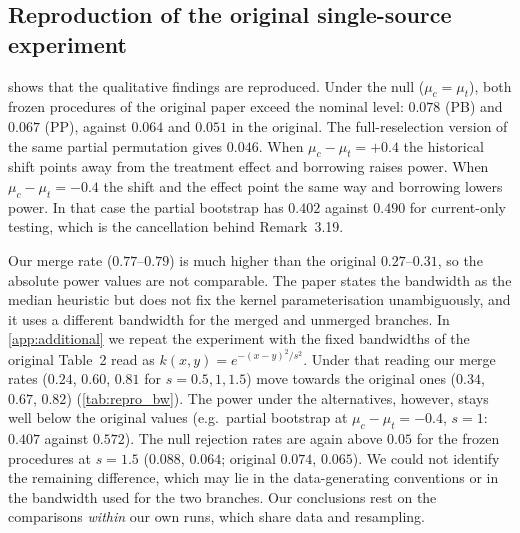 \subsection{Reproduction of the original single-source experiment}\label{sec:repro}

\begin{table}[h]
\centering\footnotesize\setlength{\tabcolsep}{4pt}
\caption{Reproduction of \citet[Table 2, median-heuristic row]{yang2026}: merge rate and rejection rates, $1000$ data sets per row ($m=50$, $n=\ell=100$, $\theta=0.4$, $\mu_h-\mu_c=0.2$). PB = partial bootstrap, PP = partial permutation; ``frozen'' is the original architecture, ``reselect'' repeats fusion in every permutation. Bold with $\uparrow$: Wilson 95\% interval above $0.05$.}\label{tab:repro}

\end{table}

 shows that the qualitative findings are reproduced. Under the null ($\mu_c=\mu_t$), both frozen procedures of the original paper exceed the nominal level: $0.078$ (PB) and $0.067$ (PP), against $0.064$ and $0.051$ in the original. The full-reselection version of the same partial permutation gives $0.046$. When $\mu_c-\mu_t=+0.4$ the historical shift points away from the treatment effect and borrowing raises power. When $\mu_c-\mu_t=-0.4$ the shift and the effect point the same way and borrowing lowers power. In that case the partial bootstrap has $0.402$ against $0.490$ for current-only testing, which is the cancellation behind Remark~3.19.

Our merge rate ($0.77$--$0.79$) is much higher than the original $0.27$--$0.31$, so the absolute power values are not comparable. The paper states the bandwidth as the median heuristic but does not fix the kernel parameterisation unambiguously, and it uses a different bandwidth for the merged and unmerged branches. In \cref{app:additional} we repeat the experiment with the fixed bandwidths of the original Table~2 read as $k(x,y)=e^{-(x-y)^2/s^2}$. Under that reading our merge rates ($0.24$, $0.60$, $0.81$ for $s=0.5,1,1.5$) move towards the original ones ($0.34$, $0.67$, $0.82$) (\cref{tab:repro_bw}). The power under the alternatives, however, stays well below the original values (e.g.\ partial bootstrap at $\mu_c-\mu_t=-0.4$, $s=1$: $0.407$ against $0.572$). The null rejection rates are again above $0.05$ for the frozen procedures at $s=1.5$ ($0.088$, $0.064$; original $0.074$, $0.065$). We could not identify the remaining difference, which may lie in the data-generating conventions or in the bandwidth used for the two branches. Our conclusions rest on the comparisons \emph{within} our own runs, which share data and resampling.

